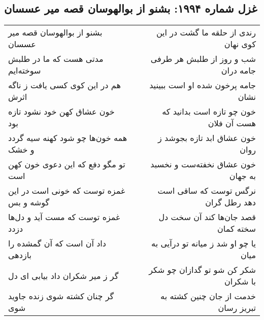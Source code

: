 \begin{center}
\section*{غزل شماره ۱۹۹۴: بشنو از بوالهوسان قصه میر عسسان}
\label{sec:1994}
\begin{longtable}{l p{0.5cm} r}
بشنو از بوالهوسان قصه میر عسسان
&&
رندی از حلقه ما گشت در این کوی نهان
\\
مدتی هست که ما در طلبش سوخته‌ایم
&&
شب و روز از طلبش هر طرفی جامه دران
\\
هم در این کوی کسی یافت ز ناگه اثرش
&&
جامه پرخون شده او است ببینید نشان
\\
خون عشاق کهن خود نشود تازه بود
&&
خون چو تازه است بدانید که هست آن فلان
\\
همه خون‌ها چو شود کهنه سیه گردد و خشک
&&
خون عشاق ابد تازه بجوشد ز روان
\\
تو مگو دفع که این دعوی خون کهن است
&&
خون عشاق نخفته‌ست و نخسبد به جهان
\\
غمزه توست که خونی است در این گوشه و بس
&&
نرگس توست که ساقی است دهد رطل گران
\\
غمزه توست که مست آید و دل‌ها دزدد
&&
قصد جان‌ها کند آن سخت دل سخته کمان
\\
داد آن است که آن گمشده را بازدهی
&&
یا چو او شد ز میانه تو درآیی به میان
\\
گر ز میر شکران داد بیابی ای دل
&&
شکر کن شو تو گدازان چو شکر با شکران
\\
گر چنان کشته شوی زنده جاوید شوی
&&
خدمت از جان چنین کشته به تبریز رسان
\\
\end{longtable}
\end{center}
